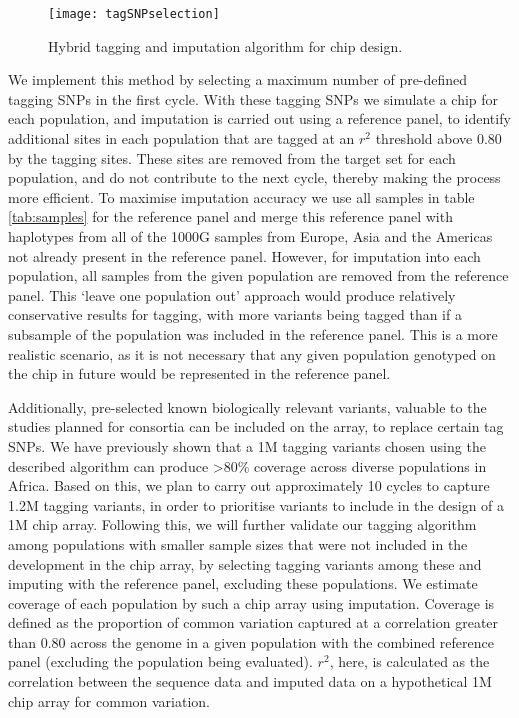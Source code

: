 \begin{figure}[!htbp]
\centering
\texttt{[image: tagSNPselection]}
\caption{Hybrid tagging and imputation algorithm for chip design.}
\end{figure}

We implement this method by selecting a maximum number of pre-defined tagging SNPs in the first cycle. With these tagging SNPs we simulate a chip for each population, and imputation is carried out using a reference panel, to identify additional sites in each population that are tagged at an $r^{2}$ threshold above 0.80 by the tagging sites. These sites are removed from the target set for each population, and do not contribute to the next cycle, thereby making the process more efficient. To maximise imputation accuracy we use all samples in table \ref{tab:samples} for the reference panel and merge this reference panel with haplotypes from all of the 1000G samples from Europe, Asia and the Americas not already present in the reference panel. However, for imputation into each population, all samples from the given population are removed from the reference panel. This ‘leave one population out’ approach would produce relatively conservative results for tagging, with more variants being tagged than if a subsample of the population was included in the reference panel. This is a more realistic scenario, as it is not necessary that any given population genotyped on the chip in future would be represented in the reference panel.

Additionally, pre-selected known biologically relevant variants, valuable to the studies planned for consortia can be included on the array, to replace certain tag SNPs. We have previously shown that a 1M tagging variants chosen using the described algorithm can produce \textgreater80\% coverage across diverse populations in Africa. Based on this, we plan to carry out approximately 10 cycles to capture 1.2M tagging variants, in order to prioritise variants to include in the design of a 1M chip array. Following this, we will further validate our tagging algorithm among populations with smaller sample sizes that were not included in the development in the chip array, by selecting tagging variants among these and imputing with the reference panel, excluding these populations. We estimate coverage of each population by such a chip array using imputation. Coverage is defined as the proportion of common variation captured at a correlation greater than 0.80 across the genome in a given population with the combined reference panel (excluding the population being evaluated). $r^{2}$, here, is calculated as the correlation between the sequence data and imputed data on a hypothetical 1M chip array for common variation. 

